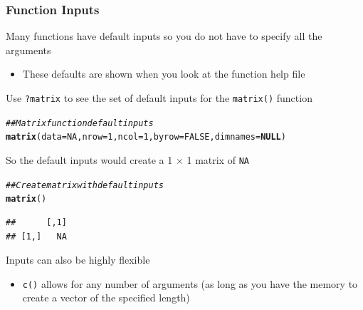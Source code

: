 \documentclass{beamer}\usepackage[]{graphicx}\usepackage[]{xcolor}
\makeatletter
\newcommand{\hlnum}[1]{\textcolor[rgb]{0.686,0.059,0.569}{#1}}%
\newcommand{\hlcom}[1]{\textcolor[rgb]{0.678,0.584,0.686}{\textit{#1}}}%
\newcommand{\hlstd}[1]{\textcolor[rgb]{0.345,0.345,0.345}{#1}}%
\newcommand{\hlkwa}[1]{\textcolor[rgb]{0.161,0.373,0.58}{\textbf{#1}}}%
\newcommand{\hlkwc}[1]{\textcolor[rgb]{0.333,0.667,0.333}{#1}}%
\newcommand{\hlkwd}[1]{\textcolor[rgb]{0.737,0.353,0.396}{\textbf{#1}}}%
\newenvironment{kframe}{%
 \def\at@end@of@kframe{}%
 \ifinner\ifhmode%
  \def\at@end@of@kframe{\end{minipage}}%
  \begin{minipage}{\columnwidth}%
 \fi\fi%
 \def\FrameCommand##1{\hskip\@totalleftmargin \hskip-\fboxsep
 \colorbox{shadecolor}{##1}\hskip-\fboxsep
     \hskip-\linewidth \hskip-\@totalleftmargin \hskip\columnwidth}%
 \MakeFramed {\advance\hsize-\width
   \@totalleftmargin\z@ \linewidth\hsize
   \@setminipage}}%
 {\par\unskip\endMakeFramed%
 \at@end@of@kframe}
\newenvironment{knitrout}{}{} %
\makeatother
\begin{document}
\begin{frame}[fragile]\frametitle{Function Inputs}
    Many functions have default inputs so you do not have to specify all the arguments
    \begin{itemize}
        \item These defaults are shown when you look at the function help file
    \end{itemize}
    \vspace{2ex}
    Use \texttt{?matrix} to see the set of default inputs for the \texttt{matrix()} function
\begin{knitrout}\footnotesize
{}\color{fgcolor}\begin{kframe}
\begin{alltt}
\hlcom{## Matrix function default inputs}
\hlkwd{matrix}\hlstd{(}\hlkwc{data} \hlstd{=} \hlnum{NA}\hlstd{,} \hlkwc{nrow} \hlstd{=} \hlnum{1}\hlstd{,} \hlkwc{ncol} \hlstd{=} \hlnum{1}\hlstd{,} \hlkwc{byrow} \hlstd{=} \hlnum{FALSE}\hlstd{,} \hlkwc{dimnames} \hlstd{=} \hlkwa{NULL}\hlstd{)}
\end{alltt}
\end{kframe}
\end{knitrout}
    \vspace{2ex}
    So the default inputs would create a 1 $\times$ 1 matrix of \texttt{NA}
\begin{knitrout}\footnotesize
{}\color{fgcolor}\begin{kframe}
\begin{alltt}
\hlcom{## Create matrix with default inputs}
\hlkwd{matrix}\hlstd{()}
\end{alltt}
\begin{verbatim}
##      [,1]
## [1,]   NA
\end{verbatim}
\end{kframe}
\end{knitrout}
    \vspace{2ex}
    Inputs can also be highly flexible
    \begin{itemize}
        \item \texttt{c()} allows for any number of arguments (as long as you have the memory to create a vector of the specified length)
    \end{itemize}
\end{frame}
\end{document}
